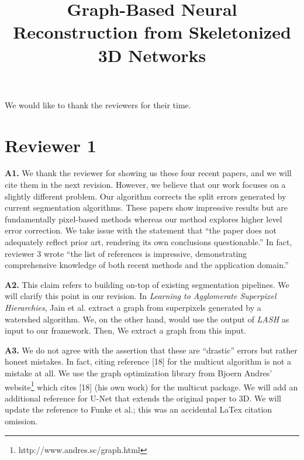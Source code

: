 \documentclass[10pt,twocolumn,letterpaper]{article}
\begin{document}
\title{Graph-Based Neural Reconstruction from Skeletonized 3D Networks}  %

\maketitle
\thispagestyle{empty}



We would like to thank the reviewers for their time.

\section*{Reviewer 1}

\textbf{A1.} 
We thank the reviewer for showing us these four recent papers, and we will cite them in the next revision. 
However, we believe that our work focuses on a slightly different problem. 
Our algorithm corrects the split errors generated by current segmentation algorithms. 
These papers show impressive results but are fundamentally pixel-based methods whereas our method explores higher level error correction. 
We take issue with the statement that ``the paper does not adequately reflect prior art, rendering its own conclusions questionable.'' 
In fact, reviewer 3 wrote ``the list of references is impressive, demonstrating comprehensive knowledge of both recent methods and the application domain.''

\textbf{A2.} 
This claim refers to building on-top of existing segmentation pipelines. 
We will clarify this point in our revision. 
In \textit{Learning to Agglomerate Superpixel Hierarchies}, Jain et al. extract a graph from superpixels generated by a watershed algorithm. 
We, on the other hand, would use the output of \textit{LASH} as input to our framework. 
Then, We extract a graph from this input.

\textbf{A3.} 
We do not agree with the assertion that these are ``drastic'' errors but rather honest mistakes. 
In fact, citing reference [18] for the multicut algorithm is not a mistake at all. 
We use the graph optimization library from Bjoern Andres' website\footnote{http://www.andres.sc/graph.html} which cites [18] (his own work) for the multicut package. 
We will add an additional reference for U-Net that extends the original paper to 3D.
We will update the reference to Funke et al.; this was an accidental LaTex citation omission.
\end{document}

